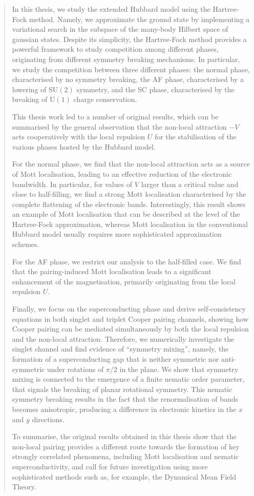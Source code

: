 \begin{abstract}
	In this thesis, we study the extended Hubbard model using the Hartree-Fock method. Namely, we approximate the ground state by implementing a variational search in the subspace of the many-body Hilbert space of gaussian states. Despite its simplicity, the Hartree-Fock method provides a powerful framework to study competition among different phases, originating from different symmetry breaking mechanisms. In particular, we study the competition between three different phases: the normal phase, characterised by no symmetry breaking, the AF phase, characterised by a lowering of $\mathrm{SU} (2)$ symmetry, and the SC phase, characterised by the breaking of $\mathrm{U}(1)$ charge conservation. 
	
	This thesis work led to a number of original results, which can be summarised by the general observation that the non-local attraction $-V$ acts cooperatively with the local repulsion $U$ for the stabilisation of the various phases hosted by the Hubbard model.
	
	For the normal phase, we find that the non-local attraction acts as a source of Mott
	localisation, leading to an effective reduction of the electronic bandwidth. In particular, for values of $V$ larger than a critical value and close to half-filling, we find a strong Mott localisation characterised by the complete flattening of the electronic bands. Interestingly, this result shows an example of Mott localisation that can be described at the level of the Hartree-Fock approximation, whereas Mott localisation in the conventional Hubbard model usually requires more sophisticated approximation schemes.
	
	For the AF phase, we restrict our analysis to the half-filled case. We find that the pairing-induced Mott localisation leads to a significant enhancement of the magnetisation, primarily originating from the local repulsion $U$.
	
	Finally, we focus on the superconducting phase and derive self-consistency equations in both singlet and triplet Cooper pairing channels, showing how Cooper pairing can be mediated simultaneously by both the local repulsion and the non-local attraction. Therefore, we numerically investigate the singlet channel and find evidence of ``symmetry mixing'', namely, the formation of a superconducting gap that is neither symmetric nor anti-symmetric under rotations of $\pi/2$ in the plane. We show that symmetry mixing is connected to the emergence of a finite nematic order parameter, that signals the breaking of planar rotational symmetry. This nematic symmetry breaking results in the fact that the renormalisation of bands becomes anisotropic, producing a difference in electronic kinetics in the $x$ and $y$ directions.
	
	To summarise, the original results obtained in this thesis show that the non-local pairing provides a different route towards the formation of key strongly correlated phenomena, including Mott localisation and nematic superconductivity, and call for future investigation using more sophisticated methods such as, for example, the Dynamical Mean Field Theory.
\end{abstract}